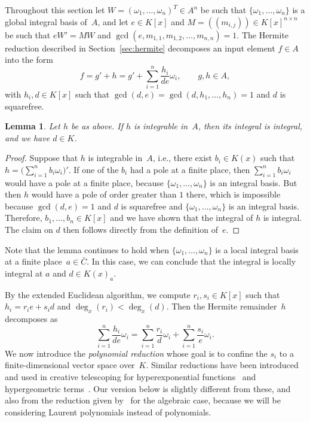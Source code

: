 \documentclass[final,1p,times,authoryear]{elsarticle}
\newtheorem{lemma}[theorem]{Lemma}
\begin{document}
Throughout this section let $W=(\omega_1,\ldots,\omega_n)^T\in A^n$ be such
that $\{\omega_1, \ldots, \omega_n\}$ is a global integral basis of~$A$, and
let $e\in K[x]$ and $M=((m_{i,j}))\in K[x]^{n\times n}$ be such that $eW'=MW$
and $\gcd(e, m_{1, 1}, m_{1, 2}, \ldots, m_{n ,n})=1$. The Hermite reduction
described in Section~\ref{sec:hermite} decomposes an input element $f\in A$
into the form
\[
  f = g' + h = g' + \sum_{i=1}^n \frac{h_i}{de} \omega_i,\qquad
  g, h\in A,
\]
with $h_i, d\in K[x]$ such that $\gcd(d, e)=\gcd(d,h_1,\dots,h_n)=1$ and $d$ is squarefree.
\begin{lemma}\label{LEM:d}
  Let $h$ be as above. If $h$ is integrable in~$A$,
  then its integral is integral, and we have $d\in K$.
\end{lemma}
\begin{proof}
  Suppose that $h$ is integrable in~$A$, i.e., there exist $b_i\in K(x)$
  such that $h = \bigl(\sum_{i=1}^n b_i \omega_i\bigr)'$.
  If one of the $b_i$ had a pole at a finite place, then $\sum_{i=1}^n b_i\omega_i$
  would have a pole at a finite place, because $\{\omega_1,\dots,\omega_n\}$ is
  an integral basis. But then $h$ would have a pole of order greater than $1$
  there, which is impossible because $\gcd(d,e)=1$ and $d$ is squarefree and
  $\{\omega_1,\dots,\omega_n\}$ is an integral basis.
  Therefore, $b_1,\dots,b_n\in K[x]$ and we have shown that the integral of $h$
  is integral. The claim on $d$ then follows directly from the definition of~$e$.
\end{proof}

Note that the lemma continues to hold when $\{\omega_1,\dots,\omega_n\}$ is
a local integral basis at a finite place~$a\in\bar C$. In this case, we can conclude
that the integral is locally integral at $a$ and $d\in K(x)_a$. 

By the extended Euclidean algorithm, we compute $r_i, s_i\in K[x]$ such that
$h_i = r_i e + s_i d$ and $\deg_x(r_i) < \deg_x(d)$. Then the Hermite remainder~$h$
decomposes as
\begin{equation}\label{EQ:h}
  \sum_{i=1}^n \frac{h_i}{de}\omega_i =
  \sum_{i=1}^n \frac{r_i}{d}\omega_i +
  \sum_{i=1}^n \frac{s_i}{e}\omega_i.
\end{equation}
We now introduce the \emph{polynomial reduction} whose goal is to confine the $s_i$ to a finite-dimensional
vector space over~$K$. Similar reductions have been introduced and used in creative telescoping
for hyperexponential functions~\citep{bostan13a} and hypergeometric terms~\citep{chen15a}.
Our version below is slightly different from these, and also from the reduction given by~\cite{chen16} for
the algebraic case, because we will be considering Laurent polynomials instead of polynomials.
\end{document}
